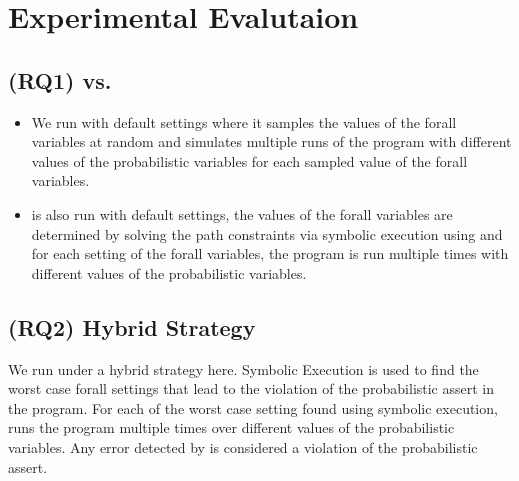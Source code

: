 \section{Experimental Evalutaion}
\label{sec:experiments}


\subsection{(RQ1) \baseaxp vs. \tool}
\begin{itemize}
	\item We run \axp with default settings where it samples the values of the forall variables at random and simulates multiple runs of the program with different values of the probabilistic variables for each sampled value of the forall variables.
	\item \tool is also run with default settings, the values of the forall variables are determined by solving the path constraints via symbolic execution using \klee and for each setting of the forall variables, the program is run multiple times with different values of the probabilistic variables.
\end{itemize}
\subsection{(RQ2) Hybrid Strategy}
We run \tool under a hybrid strategy here. Symbolic Execution is used to find the worst case forall settings that lead to the violation of the probabilistic assert in the program. For each of the worst case setting found using symbolic execution, \axp runs the program multiple times over different values of the probabilistic variables. Any error detected by \axp is considered a violation of the probabilistic assert.
